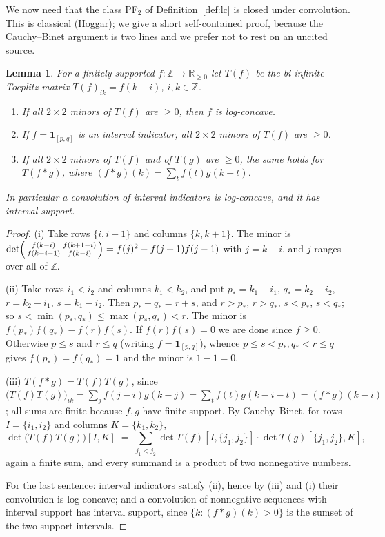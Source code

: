 \documentclass[11pt]{article}
\newtheorem{lemma}[theorem]{Lemma}
\theoremstyle{definition}
\newcommand{\Z}{\mathbb{Z}}
\newcommand{\R}{\mathbb{R}}
\begin{document}
We now need that the class PF$_2$ of Definition~\ref{def:lc} is closed under convolution. This
is classical (Hoggar); we give a short self-contained proof, because the Cauchy--Binet argument
is two lines and we prefer not to rest on an uncited source.

\begin{lemma}\label{lem:pf2}
For a finitely supported $f:\Z\to\R_{\ge0}$ let $T(f)$ be the bi-infinite Toeplitz matrix
$T(f)_{ik}=f(k-i)$, $i,k\in\Z$.
\begin{enumerate}
\item[(i)] If all $2\times2$ minors of $T(f)$ are $\ge0$, then $f$ is log-concave.
\item[(ii)] If $f=\mathbf 1_{[p,q]}$ is an interval indicator, all $2\times2$ minors of $T(f)$
are $\ge0$.
\item[(iii)] If all $2\times2$ minors of $T(f)$ and of $T(g)$ are $\ge0$, the same holds for
$T(f*g)$, where $(f*g)(k)=\sum_t f(t)g(k-t)$.
\end{enumerate}
In particular a convolution of interval indicators is log-concave, and it has interval support.
\end{lemma}

\begin{proof}
(i) Take rows $\{i,i+1\}$ and columns $\{k,k+1\}$. The minor is
$\det\begin{psmallmatrix}f(k-i)&f(k+1-i)\\ f(k-i-1)&f(k-i)\end{psmallmatrix}
=f(j)^2-f(j+1)f(j-1)$ with $j=k-i$, and $j$ ranges over all of $\Z$.

(ii) Take rows $i_1<i_2$ and columns $k_1<k_2$, and put
$p_\ast=k_1-i_1$, $q_\ast=k_2-i_2$, $r=k_2-i_1$, $s=k_1-i_2$. Then
$p_\ast+q_\ast=r+s$, and $r>p_\ast$, $r>q_\ast$, $s<p_\ast$, $s<q_\ast$; so
$s<\min(p_\ast,q_\ast)\le\max(p_\ast,q_\ast)<r$. The minor is
$f(p_\ast)f(q_\ast)-f(r)f(s)$. If $f(r)f(s)=0$ we are done since $f\ge0$. Otherwise
$p\le s$ and $r\le q$ (writing $f=\mathbf 1_{[p,q]}$), whence
$p\le s<p_\ast,q_\ast<r\le q$ gives $f(p_\ast)=f(q_\ast)=1$ and the minor is $1-1=0$.

(iii) $T(f*g)=T(f)T(g)$, since
$\big(T(f)T(g)\big)_{ik}=\sum_j f(j-i)g(k-j)=\sum_t f(t)g(k-i-t)=(f*g)(k-i)$; all sums are
finite because $f,g$ have finite support. By Cauchy--Binet, for rows $I=\{i_1,i_2\}$ and
columns $K=\{k_1,k_2\}$,
\[
  \det\big(T(f)T(g)\big)[I,K]\;=\;\sum_{j_1<j_2}
  \det T(f)[I,\{j_1,j_2\}]\cdot\det T(g)[\{j_1,j_2\},K],
\]
again a finite sum, and every summand is a product of two nonnegative numbers.

For the last sentence: interval indicators satisfy (ii), hence by (iii) and (i) their
convolution is log-concave; and a convolution of nonnegative sequences with interval support has
interval support, since $\{k:(f*g)(k)>0\}$ is the sumset of the two support intervals.
\end{proof}
\end{document}
